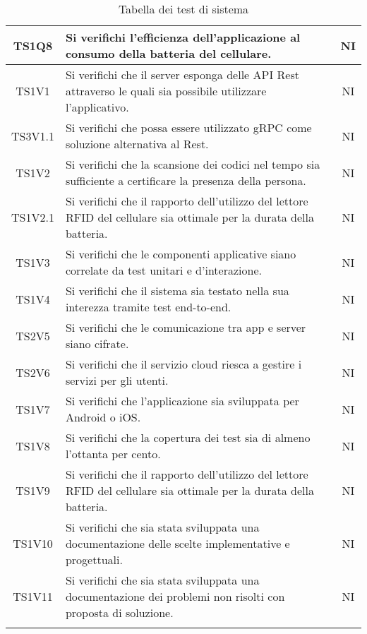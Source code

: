 \begin{center}
\begin{longtable}{|c|p{10cm}|c|}
			\hline
			TS1Q8 & Si verifichi l'efficienza dell'applicazione al consumo della batteria del cellulare. & NI \\	
			\hline
			TS1V1 & Si verifichi che il server esponga delle API Rest attraverso le quali sia possibile utilizzare l'applicativo. & NI \\	
			\hline
			TS3V1.1 & Si verifichi che possa essere utilizzato gRPC come soluzione alternativa al Rest. & NI \\	
			\hline
			TS1V2 & Si verifichi che la scansione dei codici nel tempo sia sufficiente a certificare la presenza della persona. & NI \\	
			\hline
			TS1V2.1 & Si verifichi che il rapporto dell'utilizzo del lettore RFID del cellulare sia ottimale per la durata della batteria. & NI \\	
			\hline
			TS1V3 & Si verifichi che le componenti applicative siano correlate da test unitari e d'interazione. & NI \\	
			\hline
			TS1V4 & Si verifichi che il sistema sia testato nella sua interezza tramite test end-to-end. & NI \\	
			\hline
			TS2V5 & Si verifichi che le comunicazione tra app e server siano cifrate. & NI \\	
			\hline
			TS2V6 & Si verifichi che il servizio cloud riesca a gestire i servizi per gli utenti. & NI \\	
			\hline
			TS1V7 & Si verifichi che l'applicazione sia sviluppata per Android o iOS. & NI \\	
			\hline
			TS1V8 & Si verifichi che la copertura dei test  sia di almeno l'ottanta per cento. & NI \\	
			\hline
			TS1V9 & Si verifichi che il rapporto dell'utilizzo del lettore RFID del cellulare sia ottimale per la durata della batteria. & NI \\	
			\hline
			TS1V10 & Si verifichi che sia stata sviluppata una documentazione delle scelte implementative e progettuali. & NI \\	
			\hline
			TS1V11 & Si verifichi che sia stata sviluppata una documentazione dei problemi non risolti con proposta di soluzione. & NI \\	
			\hline
			\hiderowcolors
			\caption{Tabella dei test di sistema}		
		\end{longtable}	
	\end{center}


